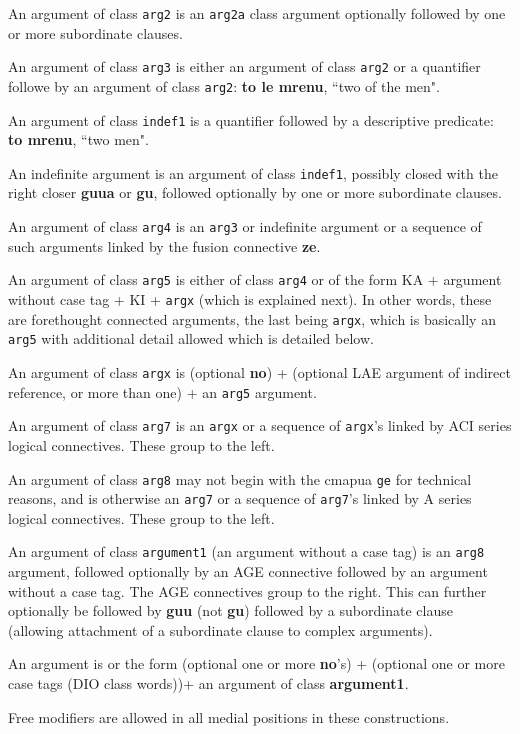 \documentclass[12pt]{book}
\begin{document}
{An argument of class {\tt arg2} is an {\tt arg2a} class argument optionally followed by one or more subordinate clauses.

An argument of class {\tt arg3} is either an argument of class {\tt arg2} or a quantifier followe by an argument of class {\tt arg2}:
{\bf to le mrenu}, ``two of the men".

An argument of class {\tt indef1} is a quantifier followed by a descriptive predicate:  {\bf to mrenu}, ``two men".

An indefinite argument is an argument of class {\tt indef1}, possibly closed with the right closer {\bf guua} or {\bf gu}, followed optionally by one or more subordinate clauses.

An argument of class {\tt arg4} is an {\tt arg3} or indefinite argument or a sequence of such arguments linked by the fusion connective {\bf ze}.

An argument of class {\tt arg5} is either of class {\tt arg4} or of the form KA + argument without case tag + KI + {\tt argx} (which is explained next).  In other words, these are forethought connected arguments, the last being {\tt argx}, which is basically an {\tt arg5} with additional detail allowed which is detailed below.

An argument of class {\tt argx} is (optional {\bf no}) + (optional LAE argument of indirect reference, or more than one) + an {\tt arg5} argument.

An argument of class {\tt arg7} is an {\tt argx} or a sequence of {\tt argx}'s linked by ACI series logical connectives.  These group to the left.

An argument of class {\tt arg8} may not begin with the cmapua {\tt ge} for technical reasons, and is otherwise an {\tt arg7} or a sequence
of {\tt arg7}'s linked by A series logical connectives.  These group to the left.

An argument of class {\tt argument1} (an argument without a case tag) is an {\tt arg8} argument, followed optionally by an AGE connective followed by an argument without a case tag.  The AGE connectives group to the right.  This can further optionally be followed by {\bf guu} (not {\bf gu}) followed by a subordinate clause (allowing attachment of a subordinate clause to complex arguments).  

An argument is or the form (optional one or more {\bf no}'s) + (optional one or more case tags (DIO class words))+ an argument of class {\bf argument1}.

Free modifiers are allowed in all medial positions in these constructions.

}
\end{document}
